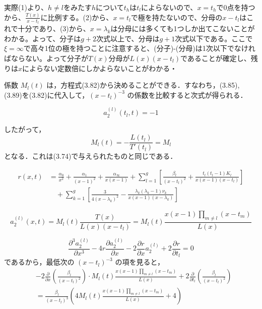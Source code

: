 実際(1)より、$h\neq l$をみたす$h$について$t_{h}$は$t_{l}$によらないので、$x=t_{h}$で0点を持つから、$\frac{T(x)}{x-t_{l}}$に比例する。(2)から、$x=t_{l}$で極を持たないので、分母の$x-t_{l}$はこれで十分であり、(3)から、$x=\lambda_{k}$は分母には多くても1つしか出てこないことがわかる。よって、分子は$g+2$次式以上で、分母は$g+1$次式以下である。ここで$\xi=\infty$で高々1位の極を持つことに注意すると、(分子)-(分母)は1次以下でなければならない。よって分子が$T(x)$分母が$L(x)(x-t_{l})$であることが確定し、残りは$x$によらない定数倍にしかよらないことがわかる・
\begin{story}
係数 $M_l(t)$ は，方程式(3.82)から決めることができる．すなわち，(3.85), (3.89)を(3.82)に代入して，$(x-t_l)^{-3}$ の係数を比較すると次式が得られる．
\end{story}

\begin{story}
\begin{equation*}
    a_2^{(l)}(t_l, t) = -1
\end{equation*}

したがって，
\begin{equation*}
    M_l(t) = -\frac{L(t_l)}{T'(t_l)} = M_l
\end{equation*}
となる．これは(3.74)で与えられたものと同じである．
\end{story}

\begin{align*}
    r(x,t) &= \frac{\alpha_0}{x^2} + \frac{\alpha_1}{(x-1)^2} + \frac{\alpha_\infty}{x(x-1)} + \sum_{l=1}^g \left[ \frac{\beta_l}{(x-t_l)^2} + \frac{t_l(t_l-1)K_l}{x(x-1)(x-t_l)} \right] \\
    &\quad + \sum_{k=1}^g \left[ \frac{3}{4(x-\lambda_k)^2} - \frac{\lambda_k(\lambda_k-1)\nu_k}{x(x-1)(x-\lambda_k)} \right]
\end{align*}

\begin{equation*}
    a_2^{(l)}(x,t) = M_l(t) \frac{T(x)}{L(x)(x-t_l)} = M_l(t) \frac{x(x-1)\prod_{m \neq l} (x-t_m)}{L(x)}
\end{equation*}

\begin{equation*}
    \frac{\partial^3 a_2^{(l)}}{\partial x^3} - 4r \frac{\partial a_2^{(l)}}{\partial x} - 2\frac{\partial r}{\partial x} a_2^{(l)} + 2\frac{\partial r}{\partial t_l} = 0
\end{equation*}
であるから，最低次の $(x-t_l)^{-3}$ の項を見ると，
\begin{align*}
    & -2 \frac{\partial}{\partial x} \left( \frac{\beta_l}{(x-t_l)^2} \right) \cdot M_l(t) \frac{x(x-1)\prod_{m \neq l} (x-t_m)}{L(x)} + 2 \frac{\partial}{\partial t_l} \left( \frac{\beta_l}{(x-t_l)^2} \right) \\
    &= \frac{\beta_l}{(x-t_l)^3} \left( 4 M_l(t) \frac{x(x-1)\prod_{m \neq l} (x-t_m)}{L(x)} + 4 \right)
\end{align*}

